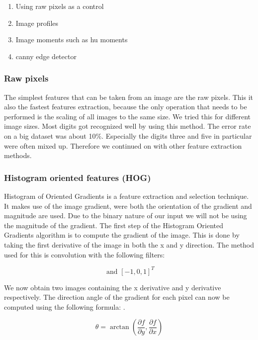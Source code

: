 \documentclass[%
        compressed,
        final,
        notitlepage,
        narroweqnarray,
        inline,
        twoside,
        ]{ieee}
\begin{document}
    \begin{enumerate}
        \item Using raw pixels as a control
        \item Image profiles
        \item Image moments such as hu moments
        \item canny edge detector
    \end{enumerate}


    \subsubsection{Raw pixels}
The simplest features that can be taken from an image are the raw pixels. This
it also the fastest features extraction, because the only operation that needs
to be performed is the scaling of all images to the same size. We tried this for
different image sizes. Most digits got recognized well by using this method. The
error rate on a big dataset was about 10\%. Especially the digits three and five in particular were often mixed up. Therefore we continued on with other feature extraction methods.

\subsubsection{Histogram oriented features (HOG)}
Histogram of Oriented Gradients is a feature extraction and selection technique. It makes use of the image gradient, were both the orientation of the gradient and magnitude are used. Due to the binary nature of our input we will not be using the magnitude of the gradient. The first step of the Histogram Oriented Gradients algorithm is to compute the gradient of the image. This is done by taking the first derivative of the image in both the x and y direction. The method used for this is convolution with the following filters:

\begin{equation}
    [-1, 0, 1] \text{ and } [-1, 0, 1]^T
\end{equation}

We now obtain two images containing the x derivative and y derivative respectively. The direction angle of the gradient for each pixel can now be computed using the following formula: .

\begin{equation}
    \theta = \arctan\left(\frac{\partial f}{\partial y}, 
        \frac{\partial f}{\partial x}\right)
\end{equation}
\end{document}
